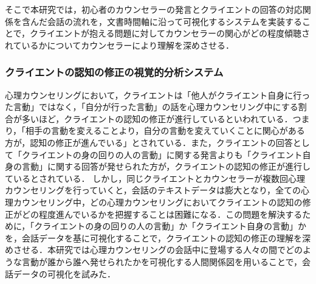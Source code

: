 \documentclass[shuuron]{kuee}
\begin{document}
そこで本研究では，初心者のカウンセラーの発言とクライエントの回答の対応関係を含んだ会話の流れを，文書時間軸に沿って可視化するシステムを実装することで，クライエントが抱える問題に対してカウンセラーの関心がどの程度傾聴されているかについてカウンセラーにより理解を深めさせる．






\subsubsection{クライエントの認知の修正の視覚的分析システム}


心理カウンセリングにおいて，クライエントは「他人がクライエント自身に行った言動」ではなく，「自分が行った言動」の話を心理カウンセリング中にする割合が多いほど，クライエントの認知の修正が進行しているといわれている．つまり，「相手の言動を変えることより，自分の言動を変えていくことに関心がある方が，認知の修正が進んでいる」\cite{zokad}とされている．また，クライエントの回答として「クライエントの身の回りの人の言動」に関する発言よりも「クライエント自身の言動」に関する回答が発せられた方が，クライエントの認知の修正が進行しているとされている．
しかし，同じクライエントとカウンセラーが複数回心理カウンセリングを行っていくと，会話のテキストデータは膨大となり，全ての心理カウンセリング中，どの心理カウンセリングにおいてクライエントの認知の修正がどの程度進んでいるかを把握することは困難になる．この問題を解決するために，「クライエントの身の回りの人の言動」か「クライエント自身の言動」かを，会話データを基に可視化することで，クライエントの認知の修正の理解を深めさせる．本研究では心理カウンセリングの会話中に登場する人々の間でどのような言動が誰から誰へ発せられたかを可視化する人間関係図を用いることで，会話データの可視化を試みた．
\end{document}

